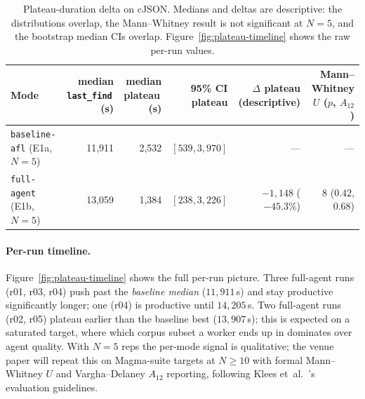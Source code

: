 \documentclass[11pt]{article}
\begin{document}
\begin{table}[t]
  \centering
  \footnotesize
  \setlength{\tabcolsep}{5pt}
  \begin{tabular}{@{}lrrrrr@{}}
    \toprule
    Mode & \makecell[r]{median\\ \texttt{last\_find}\,(s)} & \makecell[r]{median\\ plateau\,(s)} & \makecell[r]{95\% CI\\ plateau} & \makecell[r]{$\Delta$ plateau\\ (descriptive)} & \makecell[r]{Mann--Whitney $U$\\ ($p$, $A_{12}$)} \\
    \midrule
    \texttt{baseline-afl} (E1a, $N{=}5$) & 11{,}911 & 2{,}532 & $[539, 3{,}970]$ & --- & --- \\
    \texttt{full-agent}   (E1b, $N{=}5$) & 13{,}059 & 1{,}384 & $[238, 3{,}226]$ & $-1{,}148$ ($-45.3\%$) & 8 ($0.42$, $0.68$) \\
    \bottomrule
  \end{tabular}
  \caption{Plateau-duration delta on cJSON. Medians and deltas are
  descriptive: the distributions overlap, the Mann--Whitney result is
  not significant at $N{=}5$, and the bootstrap median CIs overlap.
  Figure~\ref{fig:plateau-timeline} shows the raw per-run values.}
  \label{tab:plateau-delta}
\end{table}

\paragraph{Per-run timeline.}
Figure~\ref{fig:plateau-timeline} shows the full per-run picture.
Three full-agent runs (r01, r03, r04) push past the
\emph{baseline median} ($11{,}911$\,s) and stay productive
significantly longer; one (r04) is productive until
$14{,}205$\,s. Two full-agent runs (r02, r05) plateau earlier
than the baseline best ($13{,}907$\,s); this is expected on a
saturated target, where which corpus subset a worker ends up in
dominates over agent quality. With $N{=}5$ reps the per-mode
signal is qualitative; the venue paper will repeat this on
Magma-suite targets at $N{\geq}10$ with formal Mann--Whitney $U$
and Vargha--Delaney $A_{12}$ reporting, following Klees
et~al.~\cite{klees2018evaluating}'s evaluation guidelines.
\end{document}
